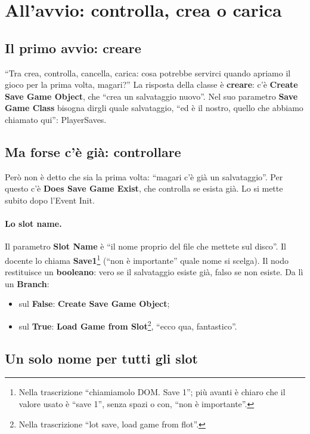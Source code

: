\section{All'avvio: controlla, crea o carica}
\label{gd16:sec:init}

\subsection{Il primo avvio: creare}

``Tra crea, controlla, cancella, carica: cosa potrebbe servirci quando apriamo
il gioco per la prima volta, magari?'' La risposta della classe è
\textbf{creare}: c'è \textbf{Create Save Game Object}, che ``crea un salvataggio
nuovo''. Nel suo parametro \textbf{Save Game Class} bisogna dirgli quale
salvataggio, ``ed è il nostro, quello che abbiamo chiamato qui'': PlayerSaves.

\subsection{Ma forse c'è già: controllare}

Però non è detto che sia la prima volta: ``magari c'è già un salvataggio''. Per
questo c'è \textbf{Does Save Game Exist}, che controlla se esista già. Lo si
mette subito dopo l'Event Init.

\paragraph{Lo slot name.} Il parametro \textbf{Slot Name} è ``il nome proprio del
file che mettete sul disco''. Il docente lo chiama \textbf{Save1}\footnote{Nella
trascrizione ``chiamiamolo DOM. Save 1''; più avanti è chiaro che il valore usato
è ``save 1'', senza spazi o con, ``non è importante''.} (``non è importante'' quale
nome si scelga). Il nodo restituisce un \textbf{booleano}: vero se il salvataggio
esiste già, falso se non esiste. Da lì un \textbf{Branch}:
\begin{itemize}
  \item sul \textbf{False}: \textbf{Create Save Game Object};
  \item sul \textbf{True}: \textbf{Load Game from Slot}\footnote{Nella
        trascrizione ``lot save, load game from flot''.}, ``ecco qua,
        fantastico''.
\end{itemize}

\subsection{Un solo nome per tutti gli slot}

